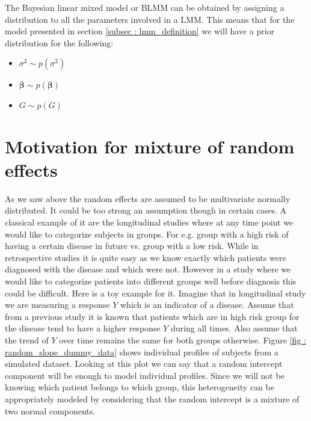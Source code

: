The Bayesian linear mixed model or BLMM can be obtained by assigning a distribution to all the parameters involved in a LMM. This means that for the model presented in section \ref{subsec : lmm_definition} we will have a prior distribution for the following:
\begin{itemize}
\item $\sigma^2 \sim p(\sigma^2)$
\item $\boldsymbol{\beta} \sim p(\boldsymbol{\beta})$
\item $G \sim p(G)$
\end{itemize}

\section{Motivation for mixture of random effects}
As we saw above the random effects are assumed to be multivariate normally distributed. It could be too strong an assumption though in certain cases. A classical example of it are the longitudinal studies where at any time point we would like to categorize subjects in groups. For e.g. group with a high risk of having a certain disease in future vs. group with a low risk. While in retrospective studies it is quite easy as we know exactly which patients were diagnosed with the disease and which were not. However in a study where we would like to categorize patients into different groups well before diagnosis this could be difficult. Here is a toy example for it. Imagine that in longitudinal study we are measuring a response $Y$ which is an indicator of a disease. Assume that from a previous study it is known that patients which are in high risk group for the disease tend to have a higher response $Y$ during all times. Also assume that the trend of $Y$ over time remains the same for both groups otherwise. Figure \ref{fig : random_slope_dummy_data} shows individual profiles of subjects from a simulated dataset. Looking at this plot we can say that a random intercept component will be enough to model individual profiles. Since we will not be knowing which patient belongs to which group, this heterogeneity can be appropriately modeled by considering that the random intercept is a mixture of two normal components.\\

